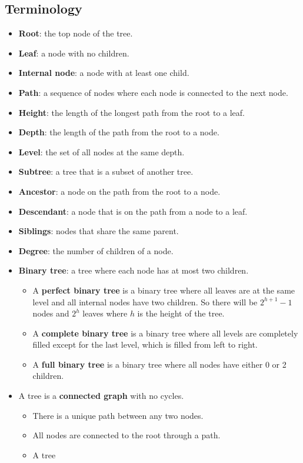 \documentclass[letterpaper,12pt]{article}
\begin{document}
\subsection{Terminology}
\begin{itemize}
    \item \textbf{Root}: the top node of the tree.
    \item \textbf{Leaf}: a node with no children.
    \item \textbf{Internal node}: a node with at least one child.
    \item \textbf{Path}: a sequence of nodes where each node is connected to the next node.
    \item \textbf{Height}: the length of the longest path from the root to a leaf.
    \item \textbf{Depth}: the length of the path from the root to a node.
    \item \textbf{Level}: the set of all nodes at the same depth.
    \item \textbf{Subtree}: a tree that is a subset of another tree.
    \item \textbf{Ancestor}: a node on the path from the root to a node.
    \item \textbf{Descendant}: a node that is on the path from a node to a leaf.
    \item \textbf{Siblings}: nodes that share the same parent.
    \item \textbf{Degree}: the number of children of a node.
    \item \textbf{Binary tree}: a tree where each node has at most two children.\begin{itemize}
        \item A \textbf{perfect binary tree} is a binary tree where all leaves are at the same level and all internal nodes have two children. So there will be $2^{h+1}-1$ nodes and $2^h$ leaves where $h$ is the height of the tree.
        \item A \textbf{complete binary tree} is a binary tree where all levels are completely filled except for the last level, which is filled from left to right. 
        \item A \textbf{full binary tree} is a binary tree where all nodes have either 0 or 2 children.
    \end{itemize}
    \item A tree is a \textbf{connected graph} with no cycles.\begin{itemize}
        \item There is a unique path between any two nodes.
        \item All nodes are connected to the root through a path.
        \item A tree
    \end{itemize}
\end{itemize}
\end{document}
